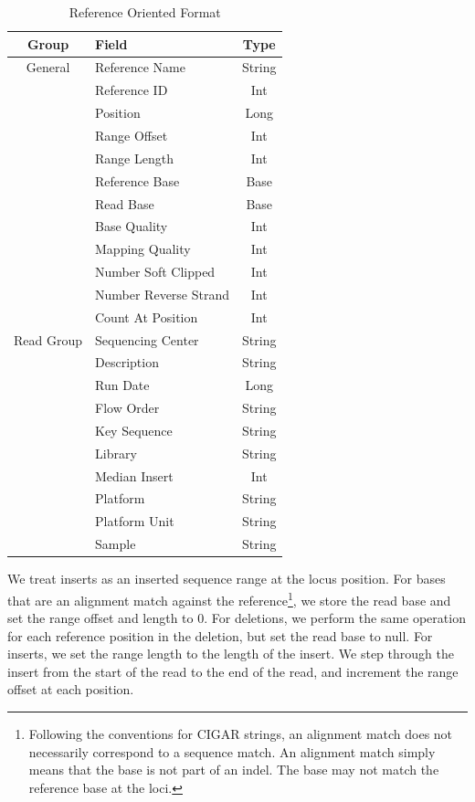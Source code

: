 \documentclass[10pt,twocolumn]{article}
\theoremstyle{plain}
\begin{document}
\begin{table}[h]
\caption{Reference Oriented Format}
\label{tab:reference-oriented-format}
\begin{center}
\begin{tabular}{| c | l | c |}
\hline
\bf Group & \bf Field & \bf Type \\
\hline
General & Reference Name & String \\
 & Reference ID & Int \\
 & Position & Long \\
 & Range Offset & Int \\
 & Range Length & Int \\
 & Reference Base & Base \\
 & Read Base & Base \\
 & Base Quality & Int \\
 & Mapping Quality & Int \\
 & Number Soft Clipped & Int \\
 & Number Reverse Strand & Int \\
 & Count At Position & Int \\
\hline
Read Group & Sequencing Center & String \\
 & Description & String \\
 & Run Date & Long \\
 & Flow Order & String \\
 & Key Sequence & String \\
 & Library & String \\
 & Median Insert & Int \\
 & Platform & String \\
 & Platform Unit & String \\
 & Sample & String \\
\hline
\end{tabular}
\end{center}
\end{table}

We treat inserts as an inserted sequence range at the locus position. For bases that are an alignment match against the
reference\footnote{Following the conventions for CIGAR strings, an alignment match does not necessarily correspond to
a sequence match. An alignment match simply means that the base is not part of an indel. The base may not match the
reference base at the loci.}, we store the read base and set the range offset and length to 0. For deletions, we perform the
same operation for each reference position in the deletion, but set the read base to null. For inserts, we set the range length
to the length of the insert. We step through the insert from the start of the read to the end of the read, and increment the
range offset at each position.
\end{document}
